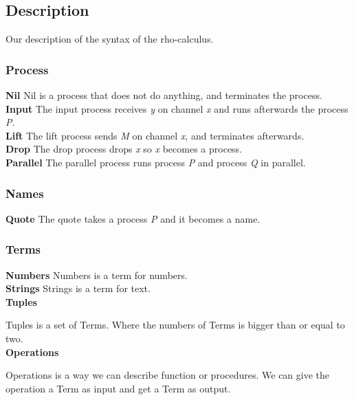 \subsection{Description}
Our description of the syntax of the rho-calculus.

\subsubsection{Process}
\textbf{Nil}
Nil is a process that does not do anything, and terminates the process.
\\
\textbf{Input}
The input process receives \textit{y} on channel \textit{x} and runs afterwards the process \textit{P}.
\\
\textbf{Lift}
The lift process sends \textit{M} on channel \textit{x}, and terminates afterwards.
\\
\textbf{Drop}
The drop process drops \textit{x} so \textit{x} becomes a process.
\\
\textbf{Parallel}
The parallel process runs process \textit{P} and process \textit{Q} in parallel.

\subsubsection{Names}
\textbf{Quote}
The quote takes a process \textit{P} and it becomes a name.

\subsubsection{Terms}
\textbf{Numbers} 
Numbers is a term for numbers.
\\
\textbf{Strings}
Strings is a term for text.
\\
\textbf{Tuples}

Tuples is a set of Terms. Where the numbers of Terms is bigger than or equal to two.
\\
\textbf{Operations}

Operations is a way we can describe function or procedures. We can give the operation a Term as input and get a Term as output.